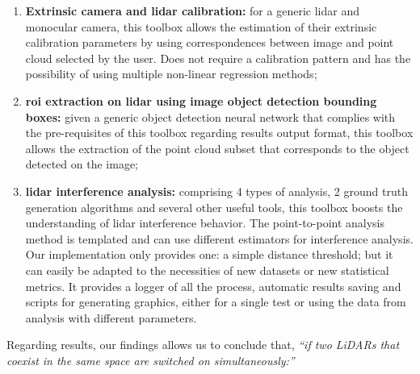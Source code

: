 \begin{enumerate}
	\item \textbf{Extrinsic camera and \ac{lidar} calibration:} for a generic \ac{lidar} and monocular camera, this toolbox allows the estimation of their extrinsic calibration parameters by using correspondences between image and point cloud selected by the user. Does not require a calibration pattern and has the possibility of using multiple non-linear regression methods;
	\item \textbf{\ac{roi} extraction on \ac{lidar} using image object detection bounding boxes:} given a generic object detection neural network that complies with the pre-requisites of this toolbox regarding results output format, this toolbox allows the extraction of the point cloud subset that corresponds to the object detected on the image;  
	\item \textbf{\ac{lidar} interference analysis:} comprising 4 types of analysis, 2 ground truth generation algorithms and several other useful tools, this toolbox boosts the understanding of \ac{lidar} interference behavior. The point-to-point analysis method is templated and can use different estimators for interference analysis. Our implementation only provides one: a simple distance threshold; but it can easily be adapted to the necessities of new datasets or new statistical metrics. It provides a logger of all the process, automatic results saving and scripts for generating graphics, either for a single test or using the data from  analysis with different parameters.
\end{enumerate}

Regarding results, our findings allows us to conclude that, \textit{``if two LiDARs that coexist in the same space are switched on simultaneously:''}

